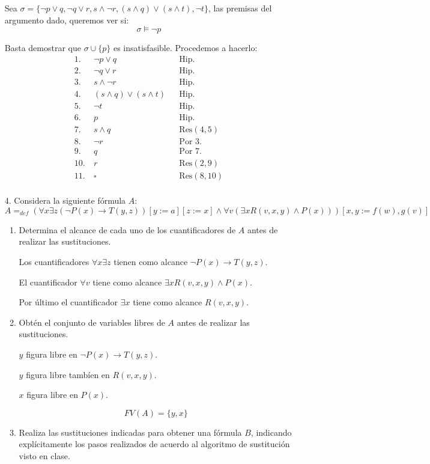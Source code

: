 \documentclass[11pt,letterpaper]{article}
\begin{document}
\begin{enumerate}
  Sea $\sigma = \{\neg p\lor q,\neg q\lor r,s\land \neg r,
  (s\land q) \lor (s\land t), \neg t\}$,
  las premisas del argumento dado, queremos ver si:
  $$ \sigma \models \neg p$$

  Basta demostrar que $\sigma\cup \{p\}$ es insatisfasible. Procedemos
  a hacerlo:
  \begin{align*}
    1.&\  \neg p\lor q& &\text{Hip.} \\
    2.&\ \neg q\lor r& &\text{Hip.}\\
    3.&\  s\land \neg r& &\text{Hip.}\\
    4.&\  (s\land q) \lor (s\land t)& &\text{Hip.}\\
    5.&\ \neg t & &\text{Hip.}\\
    6.&\ p & &\text{Hip.}\\
    7.&\ s\land q & &\text{Res}(4,5)\\
    8.&\ \neg r & &\text{Por 3.}\\
    9.&\ q & &\text{Por 7.}\\
    10.&\ r& &\text{Res}(2,9)\\
    11.&\ \square& &\text{Res}(8,10)\\
  \end{align*}
\item[4.] Considera la siguiente fórmula $A$:
  $$ A =_{def} (\forall x\exists z(\neg P(x) \rightarrow T(y, z))[y := a][z := x]
  \land \forall v(\exists xR(v, x, y) \land P(x)))[x, y := f(w), g(v)]$$
  \begin{enumerate}
  \item Determina el alcance de cada uno de los cuantificadores de
    $A$ antes de realizar las sustituciones.

    Los cuantificadores $\forall x\exists z$
    tienen como alcance $\neg P(x) \rightarrow T(y, z)$.

    El cuantificador $\forall v$ tiene como alcance
    $\exists xR(v, x, y) \land P(x)$.

    Por último el cuantificador $\exists x$ tiene como
    alcance $R(v, x, y)$.
  \item Obtén el conjunto de variables libres de $A$ antes de realizar
    las sustituciones.

    $y$ figura libre en $\neg P(x) \rightarrow T(y, z)$.

    $y$ figura libre tambíen en $R(v, x, y)$.

    $x$ figura libre en $P(x)$.

    $$FV(A) = \{y,x\}$$
  \item Realiza las sustituciones indicadas para obtener una fórmula $B$,
    indicando explícitamente los pasos realizados de acuerdo al algoritmo
    de sustitución visto en clase.


\end{enumerate}
\end{enumerate}
\end{document}
